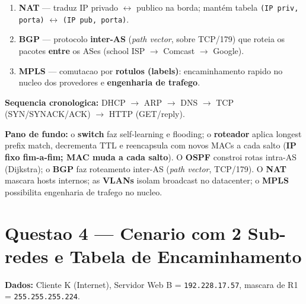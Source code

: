 \documentclass[11pt,a4paper]{article}
\begin{document}
\begin{explicacao}
\begin{enumerate}[label=\textbf{\arabic*.}, leftmargin=*, noitemsep]
    \item \textbf{NAT} --- traduz IP privado $\leftrightarrow$ publico na borda; mantém tabela \texttt{(IP priv, porta)} $\leftrightarrow$ \texttt{(IP pub, porta)}.
    \item \textbf{BGP} --- protocolo \textbf{inter-AS} (\textit{path vector}, sobre TCP/179) que roteia os pacotes \textbf{entre} os ASes (school ISP $\to$ Comcast $\to$ Google).
    \item \textbf{MPLS} --- comutacao por \textbf{rotulos (labels)}: encaminhamento rapido no nucleo dos provedores e \textbf{engenharia de trafego}.
\end{enumerate}
\end{explicacao}

\begin{resposta}
\textbf{Sequencia cronologica:} DHCP $\to$ ARP $\to$ DNS $\to$ TCP (SYN/SYNACK/ACK) $\to$ HTTP (GET/reply).

\smallskip
\textbf{Pano de fundo:} o \textbf{switch} faz self-learning e flooding; o \textbf{roteador} aplica longest prefix match, decrementa TTL e reencapsula com novos MACs a cada salto (\textbf{IP fixo fim-a-fim; MAC muda a cada salto}). O \textbf{OSPF} constroi rotas intra-AS (Dijkstra); o \textbf{BGP} faz roteamento inter-AS (\textit{path vector}, TCP/179). O \textbf{NAT} mascara hosts internos; as \textbf{VLANs} isolam broadcast no datacenter; o \textbf{MPLS} possibilita engenharia de trafego no nucleo.
\end{resposta}

\hrulefill

\section*{Questao 4 --- Cenario com 2 Sub-redes e Tabela de Encaminhamento}

\textbf{Dados:} Cliente K (Internet), Servidor Web B = \texttt{192.228.17.57}, mascara de R1 = \texttt{255.255.255.224}.
\end{document}
